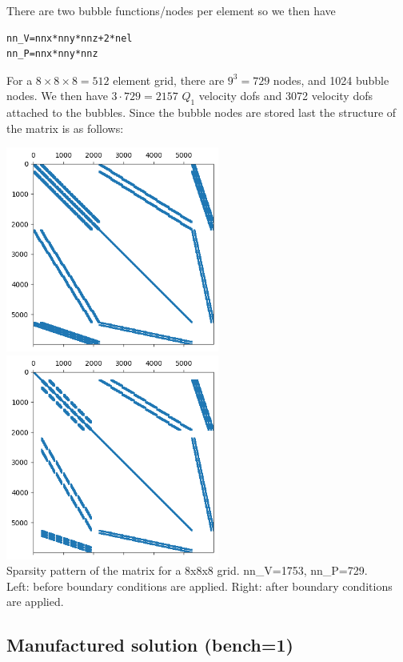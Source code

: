 There are two bubble functions/nodes per element so we then have 
\begin{lstlisting}
nn_V=nnx*nny*nnz+2*nel 
nn_P=nnx*nny*nnz
\end{lstlisting}
For a $8\times 8 \times 8=512$ element grid, there are $9^3=729$ nodes, and 1024 bubble nodes.
We then have $3\cdot 729=2157$ $Q_1$ velocity dofs and 3072 velocity dofs attached 
to the bubbles.
Since the bubble nodes are stored last the structure of the matrix is as follows:
\begin{center}
\includegraphics[width=7cm]{python_codes/fieldstone_82/results/matrix_8x8x8_bef_bc}
\includegraphics[width=7cm]{python_codes/fieldstone_82/results/matrix_8x8x8_aft_bc}\\
{\captionfont Sparsity pattern of the matrix for a 8x8x8 grid.
nn\_V=1753, nn\_P=729.\\ Left:
before boundary conditions are applied. 
Right: after boundary conditions are applied.} 
\end{center}

\subsection*{Manufactured solution (bench=1)}

